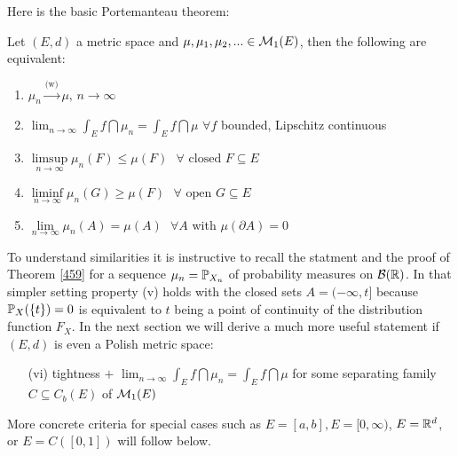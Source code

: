Here is the basic Portemanteau theorem:
\begin{lsatzwichtig}
\begin{theorem}
	Let $(E,d)$ a metric space and $\mu,\mu_1,\mu_2,...\in \cM_1(E)$, then the following are equivalent:
	\begin{enumerate}[label=(\roman*)]
		\item $\mu_n \overset{\text{(w)}}{\longrightarrow} \mu,\, n\to\infty$
		\item $\lim_{n\to\infty} \int_E f \dint \mu_n = \int_E f \dint \mu$\:\: $\forall f$ bounded, Lipschitz continuous
		\item $\limsup\limits_{n\to\infty}\mu_n(F) \leq \mu(F) \:\:\: \forall \text{ closed }F\subseteq E$
		\item $\liminf\limits_{n\to\infty}\mu_n(G) \geq \mu(F) \:\:\: \forall \text{ open }G\subseteq E$
		\item $\lim\limits_{n\to\infty}\mu_n(A) = \mu(A) \:\:\:\forall A$ with $\mu(\partial A)=0$
	\end{enumerate}
\end{theorem}
\end{lsatzwichtig}
To understand similarities it is instructive to recall the statment and the proof of Theorem \ref{459} for a sequence $\mu_n=\P_{X_n}$ of probability measures on $\mathcal B(\R)$. In that simpler setting property (v) holds with the closed sets
 $A=(-\infty,t]$ because $\P_X(\{t\})=0$ is equivalent to $t$ being a point of continuity of the distribution function $F_X$. In the next section we will derive a much more useful statement if $(E,d)$ is even a Polish metric space:
 \begin{lwarnhinweis}
	\begin{itemize}
		\item[(vi)] tightness $+$ $\lim_{n\to\infty} \int_E f\dint \mu_n= \int_E f \dint \mu$ for some separating family $C\subseteq C_b(E)$ of $\cM_1(E)$
	\end{itemize}
	\end{lwarnhinweis}
More concrete criteria for special cases such as $E=[a,b], E=[0,\infty)$, $E=\R^d$, or $E=C([0,1])$ will follow below.



